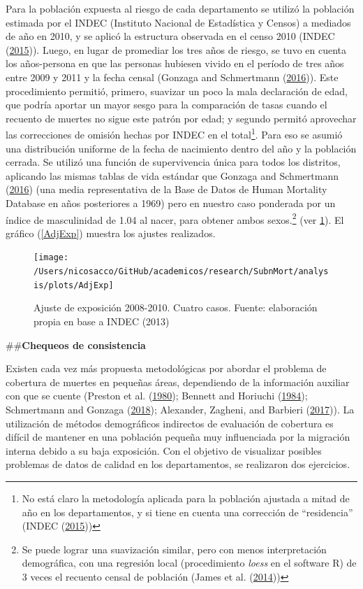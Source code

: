 \documentclass[12pt,]{article}
\begin{document}
Para la población expuesta al riesgo de cada departamento se utilizó la
población estimada por el INDEC (Instituto Nacional de Estadística y
Censos) a mediados de año en 2010, y se aplicó la estructura observada
en el censo 2010 (INDEC (\protect\hyperlink{ref-INDEC2015}{2015})).
Luego, en lugar de promediar los tres años de riesgo, se tuvo en cuenta
los años-persona en que las personas hubiesen vivido en el período de
tres años entre 2009 y 2011 y la fecha censal (Gonzaga and Schmertmann
(\protect\hyperlink{ref-Gonzaga_Schmertmann_2016}{2016})). Este
procedimiento permitió, primero, suavizar un poco la mala declaración de
edad, que podría aportar un mayor sesgo para la comparación de tasas
cuando el recuento de muertes no sigue este patrón por edad; y segundo
permitó aprovechar las correcciones de omisión hechas por INDEC en el
total\footnote{No está claro la metodología aplicada para la población
  ajustada a mitad de año en los departamentos, y si tiene en cuenta una
  corrección de ``residencia'' (INDEC
  (\protect\hyperlink{ref-INDEC2015}{2015}))}. Para eso se asumió una
distribución uniforme de la fecha de nacimiento dentro del año y la
población cerrada. Se utilizó una función de supervivencia única para
todos los distritos, aplicando las mismas tablas de vida estándar que
Gonzaga and Schmertmann
(\protect\hyperlink{ref-Gonzaga_Schmertmann_2016}{2016}) (una media
representativa de la Base de Datos de Human Mortality Database en años
posteriores a 1969) pero en nuestro caso ponderada por un índice de
masculinidad de 1.04 al nacer, para obtener ambos sexos.\footnote{Se
  puede lograr una suavización similar, pero con menos interpretación
  demográfica, con una regresión local (procedimiento \emph{loess} en el
  software R) de 3 veces el recuento censal de población (James et al.
  (\protect\hyperlink{ref-James2014}{2014}))} (ver \ref{fig:AdjExp}). El
gráfico (\ref{AdjExp}) muestra los ajustes realizados.

\begin{figure}

{\centering \texttt{[image: /Users/nicosacco/GitHub/academicos/research/SubnMort/analysis/plots/AdjExp]} 

}

\caption{Ajuste de exposición 2008-2010. Cuatro casos. Fuente: elaboración propia en base a INDEC (2013)}\label{fig:AdjExp}
\end{figure}

\#\#\textbf{Chequeos de consistencia}

Existen cada vez más propuesta metodológicas por abordar el problema de
cobertura de muertes en pequeñas áreas, dependiendo de la información
auxiliar con que se cuente (Preston et al.
(\protect\hyperlink{ref-Preston1980}{1980}); Bennett and Horiuchi
(\protect\hyperlink{ref-Bennett_Horiuchi_1984}{1984}); Schmertmann and
Gonzaga (\protect\hyperlink{ref-Schmertmann2018}{2018}); Alexander,
Zagheni, and Barbieri (\protect\hyperlink{ref-Alexander2017}{2017})). La
utilización de métodos demográficos indirectos de evaluación de
cobertura es difícil de mantener en una población pequeña muy
influenciada por la migración interna debido a su baja exposición. Con
el objetivo de visualizar posibles problemas de datos de calidad en los
departamentos, se realizaron dos ejercicios.
\end{document}
